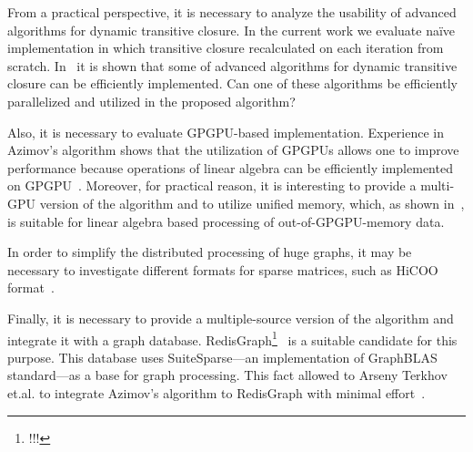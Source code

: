 From a practical perspective, it is necessary to analyze the usability of advanced algorithms for dynamic transitive closure.
In the current work we evaluate na{\"i}ve implementation in which transitive closure recalculated on each iteration from scratch.
In~\cite{cs6345} it is shown that some of advanced algorithms for dynamic transitive closure can be efficiently implemented.
Can one of these algorithms be efficiently parallelized and utilized in the proposed algorithm?

Also, it is necessary to evaluate GPGPU-based implementation.
Experience in Azimov's algorithm shows that the utilization of GPGPUs allows one to improve performance because operations of linear algebra can be efficiently implemented on GPGPU~\cite{!!!}. 
Moreover, for practical reason, it is interesting to provide a multi-GPU version of the algorithm and to utilize unified memory, which, as shown in~\cite{!!!}, is suitable for linear algebra based processing of out-of-GPGPU-memory data.

In order to simplify the distributed processing of huge graphs, it may be necessary to investigate different formats for sparse matrices, such as HiCOO format~\cite{!!!}. 

Finally, it is necessary to provide a multiple-source version of the algorithm and integrate it with a graph database.
RedisGraph\footnote{!!!}~\cite{!!!} is a suitable candidate for this purpose.
This database uses SuiteSparse---an implementation of GraphBLAS standard---as a base for graph processing.
This fact allowed to Arseny Terkhov et.al.  to integrate Azimov's algorithm to RedisGraph with minimal effort~\cite{!!!}.




